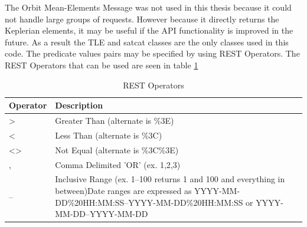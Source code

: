 \documentclass[12pt]{article}
\begin{document}
The Orbit Mean-Elements Message was not used in this thesis because it could not handle large groups of requests. However because it directly returns the Keplerian elements, it may be useful if the API functionality is improved in the future. As a result the TLE and satcat classes are the only classes used in this code. The predicate values pairs may be specified by using REST Operators. The REST Operators that can be used are seen in table \ref{tab:restOP}

\begin{table}[H]\singlespacing
	\caption{REST Operators\cite{SpaceTrackAPI}}
	\label{tab:restOP}
	\begin{tabular}{|l|p{13.5cm}|}
		\hline
		Operator                  & Description                                                                                                                                                                                                                                                                         \\ \hline
		\textgreater{}            & Greater Than (alternate is \%3E)                                                                                                                                                                                                                                                    \\ \hline
		\textless{}               & Less Than (alternate is \%3C)                                                                                                                                                                                                                                                       \\ \hline
		\textless{}\textgreater{} & Not Equal (alternate is \%3C\%3E)                                                                                                                                                                                                                                                   \\ \hline
		,                         & Comma Delimited 'OR' (ex. 1,2,3)                                                                                                                                                                                                                                                    \\ \hline
		--                        & Inclusive Range (ex. 1--100 returns 1 and 100 and everything in between)Date ranges are expressed as YYYY-MM-DD\%20HH:MM:SS--YYYY-MM-DD\%20HH:MM:SS or YYYY-MM-DD--YYYY-MM-DD                                                                                                       \\ \hline

\end{tabular}
\end{table}
\end{document}
